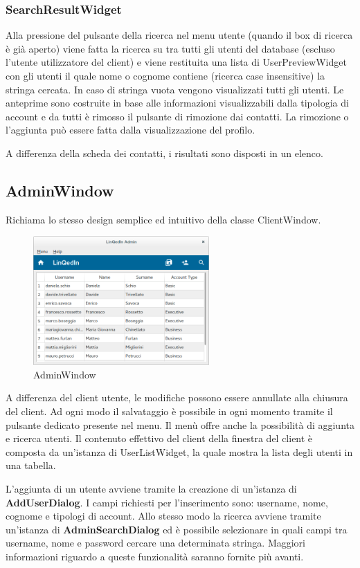 \documentclass[a4paper]{article}
\begin{document}
\subsubsection*{SearchResultWidget}
Alla pressione del pulsante della ricerca nel menu utente (quando il box di ricerca è già aperto) viene fatta la ricerca su tra tutti gli utenti del database (escluso l'utente utilizzatore del client) e viene restituita una lista di UserPreviewWidget con gli utenti il quale nome o cognome contiene (ricerca case insensitive) la stringa cercata. In caso di stringa vuota vengono visualizzati tutti gli utenti. Le anteprime sono costruite in base alle informazioni visualizzabili dalla tipologia di account e da tutti è rimosso il pulsante di rimozione dai contatti. La rimozione o l'aggiunta può essere fatta dalla visualizzazione del profilo.

A differenza della scheda dei contatti, i risultati sono disposti in un elenco.

\subsection*{AdminWindow}
Richiama lo stesso design semplice ed intuitivo della classe ClientWindow.

\begin{figure}[!ht]
\centering
\includegraphics[width=0.6\textwidth]{AdminWindow.png}
\caption{AdminWindow}
\end{figure}

A differenza del client utente, le modifiche possono essere annullate alla chiusura del client. Ad ogni modo il salvataggio è possibile in ogni momento tramite il pulsante dedicato presente nel menu. Il menù offre anche la possibilità di aggiunta e ricerca utenti. Il contenuto effettivo del client della finestra del client è composta da un'istanza di UserListWidget, la quale mostra la lista degli utenti in una tabella.

L'aggiunta di un utente avviene tramite la creazione di un'istanza di \textbf{AddUserDialog}. I campi richiesti per l'inserimento sono: username, nome, cognome e tipologi di account. Allo stesso modo la ricerca avviene tramite un'istanza di \textbf{AdminSearchDialog} ed è possibile selezionare in quali campi tra username, nome e password cercare una determinata stringa. Maggiori informazioni riguardo a queste funzionalità saranno fornite più avanti.
\end{document}
